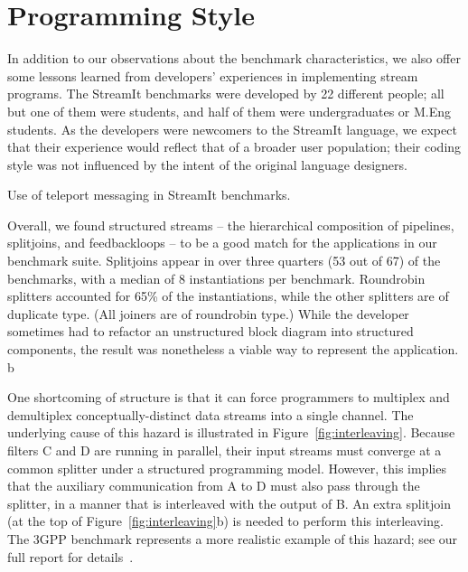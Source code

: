 \section{Programming Style}

In addition to our observations about the benchmark characteristics,
we also offer some lessons learned from developers' experiences in
implementing stream programs.  
The StreamIt benchmarks were developed by 22 different people; all but
one of them were students, and half of them were undergraduates or
M.Eng students.
As the developers were newcomers to the StreamIt language, we expect
that their experience would reflect that of a broader user population;
their coding style was not influenced by the intent of the original
language designers.

\begin{table*}[t!]
\caption{Use of teleport messaging in StreamIt 
benchmarks.\protect\label{tab:lang-messaging}}
\end{table*}

\myitem {\structuredstreams} Overall, we found structured streams --
the hierarchical composition of pipelines, splitjoins, and
feedbackloops -- to be a good match for the applications in our
benchmark suite.  Splitjoins appear in over three quarters (53 out of
67) of the benchmarks, with a median of 8 instantiations per
benchmark.  Roundrobin splitters accounted for 65\% of the
instantiations, while the other splitters are of duplicate type.  (All
joiners are of roundrobin type.)  While the developer sometimes had to
refactor an unstructured block diagram into structured components, the
result was nonetheless a viable way to represent the application.
b\label{sec:structure}


One shortcoming of structure is that it can force programmers to
multiplex and demultiplex conceptually-distinct data streams into a
single channel.  The underlying cause of this hazard is illustrated in
Figure~\ref{fig:interleaving}.  Because filters C and D are running in
parallel, their input streams must converge at a common splitter under
a structured programming model.  However, this implies that the
auxiliary communication from A to D must also pass through the
splitter, in a manner that is interleaved with the output of B.  An
extra splitjoin (at the top of Figure~\ref{fig:interleaving}b) is
needed to perform this interleaving.  The 3GPP benchmark represents a
more realistic example of this hazard; see our full report for
details~\cite{thies-thesis}.

